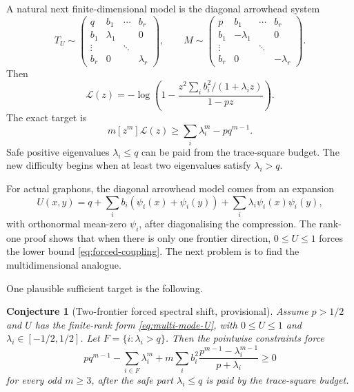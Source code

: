 \documentclass[11pt]{article}
\newtheorem{conjecture}[theorem]{Conjecture}
\begin{document}
A natural next finite-dimensional model is the diagonal arrowhead system
\begin{equation}\label{eq:two-frontier-arrowhead}
        T_U\sim
        \begin{pmatrix}
        q&b_1&\cdots&b_r\\
        b_1&\lambda_1&&0\\
        \vdots&&\ddots&\\
        b_r&0&&\lambda_r
        \end{pmatrix},
        \qquad
        M\sim
        \begin{pmatrix}
        p&b_1&\cdots&b_r\\
        b_1&-\lambda_1&&0\\
        \vdots&&\ddots&\\
        b_r&0&&-\lambda_r
        \end{pmatrix}.
\end{equation}
Then
\[
        \mathcal L(z)=
        -\log\left(1-
        \frac{z^2\sum_i b_i^2/(1+\lambda_i z)}{1-pz}
        \right).
\]
The exact target is
\begin{equation}\label{eq:arrowhead-target}
        m[z^m]\mathcal L(z)
        \ge
        \sum_i\lambda_i^m-pq^{m-1}.
\end{equation}
Safe positive eigenvalues $\lambda_i\le q$ can be paid from the trace-square budget.  The new difficulty begins when at least two eigenvalues satisfy $\lambda_i>q$.

For actual graphons, the diagonal arrowhead model comes from an expansion
\begin{equation}\label{eq:multi-mode-U}
        U(x,y)=q+
        \sum_i b_i(\psi_i(x)+\psi_i(y))+
        \sum_i\lambda_i\psi_i(x)\psi_i(y),
\end{equation}
with orthonormal mean-zero $\psi_i$, after diagonalising the compression.  The rank-one proof shows that when there is only one frontier direction, $0\le U\le1$ forces the lower bound \eqref{eq:forced-coupling}.  The next problem is to find the multidimensional analogue.

One plausible sufficient target is the following.

\begin{conjecture}[Two-frontier forced spectral shift, provisional]\label{conj:two-frontier}
Assume $p>1/2$ and $U$ has the finite-rank form \eqref{eq:multi-mode-U}, with $0\le U\le1$ and $\lambda_i\in[-1/2,1/2]$.  Let $F=\{i:\lambda_i>q\}$.  Then the pointwise constraints force
\begin{equation}\label{eq:linear-two-frontier-target}
        p q^{m-1}-\sum_{i\in F}\lambda_i^m
        +m\sum_i b_i^2
        \frac{p^{m-1}-\lambda_i^{m-1}}{p+\lambda_i}
        \ge0
\end{equation}
for every odd $m\ge3$, after the safe part $\lambda_i\le q$ is paid by the trace-square budget.
\end{conjecture}
\end{document}
